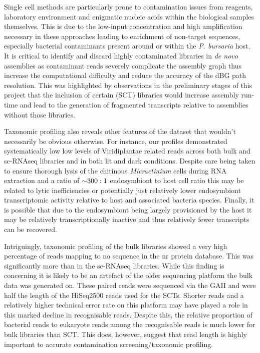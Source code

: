 Single cell methods are particularly prone to contamination issues
from reagents, laboratory environment and enigmatic nucleic acids within the biological samples themselves.
This is due to the low-input concentration and high amplification necessary in these approaches \citep{Blainey2013} 
leading to enrichment of non-target sequences, especially bacterial contaminants present around or within the
\textit{P. bursaria} host.  
It is critical to identify and discard highly contaminated libraries in \textit{de novo} assemblies as contaminant
reads severely complicate the assembly graph thus increase the computational difficulty and reduce the accuracy
of the dBG path resolution.  This was highlighted by observations in the preliminary 
stages of this project that the inclusion of certain (SCT) libraries would increase
assembly run-time and lead to the generation of fragmented transcripts relative to assemblies without those
libraries.  

Taxonomic profiling also reveals other features of the dataset that wouldn't necessarily be
obvious otherwise.  For instance, our profiles demonstrated systematically low 
low levels of Viridiplantae related reads across both bulk and sc-RNAseq libraries and in both lit and dark conditions.  
Despite care being taken to ensure thorough lysis of the chitinous \textit{Micractinium} cells during 
RNA extraction and a ratio of \({\mathord{\sim}}300:1\) endosymbiont to host cell ratio this may be related to lytic inefficiencies \citep{Korfhage2015} or potentially
just relatively lower endosymbiont transcriptomic activity relative to host and associated bacteria species.
Finally, it is possible that due to the endosymbiont being largely provisioned by the host it may be relatively
transcriptionally inactive and thus relatively fewer transcripts can be recovered. 



Intriguingly, taxonomic profiling of the bulk libraries showed a very high percentage of reads 
mapping to no sequence in the nr protein database.  This was significantly more than in the
sc-RNAseq libraries.  While this finding is concerning it is likely to be an artefact of the older 
sequencing platform the bulk data was generated on.
These paired reads were sequenced via the GAII and were half the length of the HiSeq2500 reads used for 
the SCTs.  Shorter reads and a relatively higher
technical error rate on this platform may have played a role in this marked decline in recognisable reads. 
Despite this, the relative proportion of bacterial reads to eukaryote reads among the 
recognisable reads is much lower for bulk libraries than SCT.  This does, however, suggest that
read length is highly important to accurate contamination screening/taxonomic profiling.

